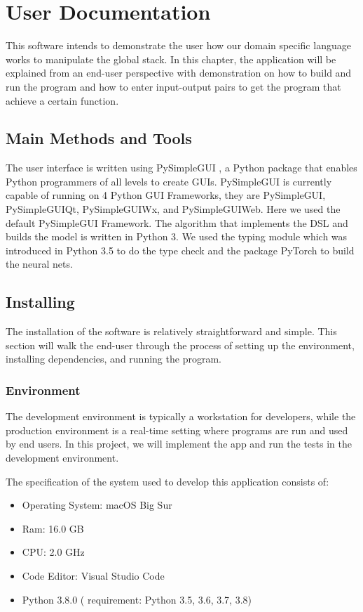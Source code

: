 \chapter{User Documentation}
\label{user}
This software intends to demonstrate the user how our domain specific language works to manipulate the global stack. In this chapter, the application will be explained from an end-user perspective with demonstration on how to build and run the program and how to enter input-output pairs to get the program that achieve a certain function.

\section{Main Methods and Tools}
\label{sec:tools}
The user interface is written using PySimpleGUI \cite{psgui}, a Python package that enables Python programmers of all levels to create GUIs. PySimpleGUI is currently capable of running on 4 Python GUI Frameworks, they are PySimpleGUI, PySimpleGUIQt, PySimpleGUIWx, and PySimpleGUIWeb. Here we used the default PySimpleGUI Framework. The algorithm that implements the DSL and builds the model is written in Python 3. We used the typing module which was introduced in Python 3.5 \cite{typing} to do the type check and the package PyTorch \cite{pytorch} to build the neural nets.

\section{Installing}
\label{install}
The installation of the software is relatively straightforward and simple. This section will walk the end-user through the process of setting up the environment, installing dependencies, and running the program.

\subsection{Environment}
The development environment is typically a workstation for developers, while the production environment is a real-time setting where programs are run and used by end users. In this project, we will implement the app and run the tests in the development environment.

The specification of the system used to develop this application consists of:
\begin{itemize}
    \item Operating System: macOS Big Sur
    \item Ram: 16.0 GB
    \item CPU: 2.0 GHz
    \item Code Editor: Visual Studio Code
    \item Python 3.8.0 ( requirement: Python 3.5, 3.6, 3.7, 3.8)
\end{itemize}
